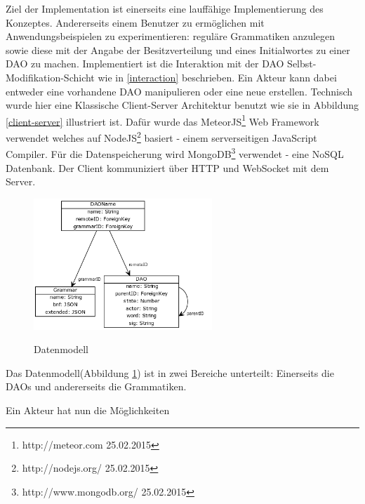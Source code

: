 \documentclass[a4paper,12pt]{report}
\begin{document}
Ziel der Implementation ist einerseits eine lauffähige Implementierung des Konzeptes. Andererseits einem Benutzer zu ermöglichen mit Anwendungsbeispielen zu experimentieren: reguläre Grammatiken anzulegen sowie diese mit der Angabe der Besitzverteilung und eines Initialwortes zu einer DAO zu machen.
Implementiert ist die Interaktion mit der DAO Selbst-Modifikation-Schicht wie in \ref{interaction} beschrieben. Ein Akteur kann dabei entweder eine vorhandene DAO manipulieren oder eine neue erstellen. Technisch wurde hier eine Klassische Client-Server Architektur benutzt wie sie in Abbildung \ref{client-server} illustriert ist. Dafür wurde das MeteorJS\footnote{http://meteor.com 25.02.2015} Web Framework verwendet
welches auf NodeJS\footnote{http://nodejs.org/ 25.02.2015} basiert - einem serverseitigen JavaScript Compiler. Für die Datenspeicherung wird MongoDB\footnote{http://www.mongodb.org/ 25.02.2015} verwendet - eine NoSQL Datenbank. Der Client kommuniziert über HTTP und WebSocket mit dem Server.


\begin{figure}[ht]
    \centering
    \includegraphics[width=0.60\textwidth]{bilder/dataModel.png}
    \label{datamodel}
    \caption{Datenmodell}
\end{figure}

Das Datenmodell(Abbildung \ref{datamodel}) ist in zwei Bereiche unterteilt: Einerseits die DAOs und andererseits die Grammatiken. 

Ein Akteur hat nun die Möglichkeiten 
\end{document}
